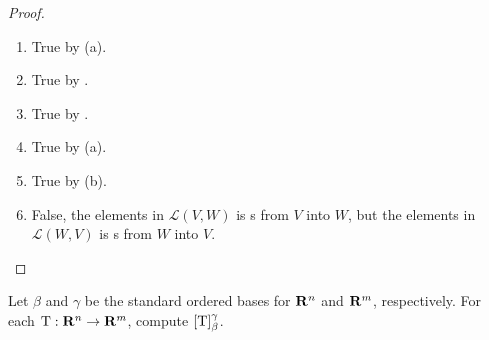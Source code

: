 \begin{proof} \ 
\begin{enumerate}
\item True by (a).
\item True by .
\item True by .
\item True by (a).
\item True by (b).
\item False, the elements in \(\mathcal{L}(V, W)\) is \LTRAN{}s from \(V\) into \(W\), but the elements in \(\mathcal{L}(W, V)\) is \LTRAN{}s from \(W\) into \(V\).
\end{enumerate}
\end{proof}

\begin{exercise} \label{exercise 2.2.2}
Let \(\beta\) and \(\gamma\) be the standard ordered bases for \(\mathbf{R}^n\) and \(\mathbf{R}^m\), respectively.
For each \LTRAN{} \(\mathrm{T}: \mathbf{R}^n \to \mathbf{R}^m\), compute \([\mathrm{T}]_{\beta}^{\gamma}\).
\end{exercise}

